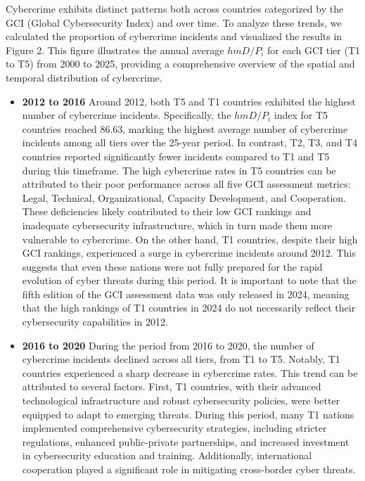 	Cybercrime exhibits distinct patterns both across countries categorized by the GCI (Global Cybersecurity Index) and over time.
	To analyze these trends, we calculated the proportion of cybercrime incidents and visualized the results in Figure 2.
	This figure illustrates the annual average $hmD/P_i$ for each GCI tier (T1 to T5) from 2000 to 2025,
	providing a comprehensive overview of the spatial and temporal distribution of cybercrime.
	\begin{itemize}
		\item \textbf{2012 to 2016} Around 2012, both T5 and T1 countries exhibited the highest number of cybercrime incidents.
			Specifically, the $hmD/P_i$ index for T5 countries reached 86.63,
			marking the highest average number of cybercrime incidents among all tiers over the 25-year period.
			In contrast, T2, T3, and T4 countries reported significantly fewer incidents compared to T1 and T5 during this timeframe.
			The high cybercrime rates in T5 countries can be attributed to their poor performance across all five GCI assessment metrics:
			Legal, Technical, Organizational, Capacity Development, and Cooperation.
			These deficiencies likely contributed to their low GCI rankings and inadequate cybersecurity infrastructure,
			which in turn made them more vulnerable to cybercrime.
			On the other hand, T1 countries, despite their high GCI rankings, experienced a surge in cybercrime incidents around 2012.
			This suggests that even these nations were not fully prepared for the rapid evolution of cyber threats during this period.
			It is important to note that the fifth edition of the GCI assessment data was only released in 2024,
			meaning that the high rankings of T1 countries in 2024 do not necessarily reflect their cybersecurity capabilities in 2012.
		\item \textbf{2016 to 2020} During the period from 2016 to 2020, the number of cybercrime incidents declined across all tiers, from T1 to T5.
			Notably, T1 countries experienced a sharp decrease in cybercrime rates.
			This trend can be attributed to several factors.
			First, T1 countries, with their advanced technological infrastructure and robust cybersecurity policies,
			were better equipped to adapt to emerging threats.
			During this period, many T1 nations implemented comprehensive cybersecurity strategies,
			including stricter regulations, enhanced public-private partnerships, and increased investment in cybersecurity education and training.
			Additionally, international cooperation played a significant role in mitigating cross-border cyber threats.

\end{itemize}

